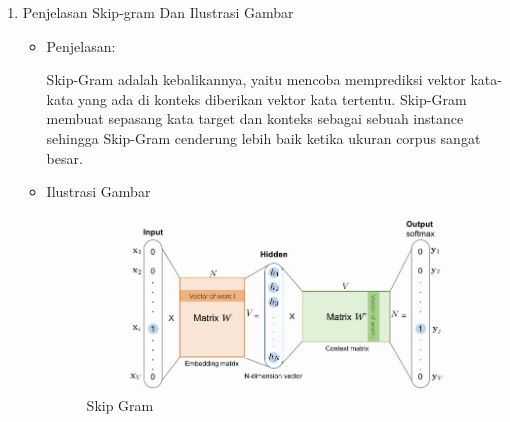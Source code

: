 \begin{enumerate}
\begin{itemize}
\end{itemize}

\item Penjelasan Skip-gram Dan Ilustrasi Gambar
\begin{itemize}
\item  Penjelasan:

Skip-Gram adalah kebalikannya, yaitu mencoba memprediksi vektor kata-kata yang ada di konteks diberikan vektor kata tertentu. Skip-Gram membuat sepasang kata target dan konteks sebagai sebuah instance sehingga Skip-Gram cenderung lebih baik ketika ukuran corpus sangat besar. 

\item Ilustrasi Gambar

\begin{figure}[!hbtp]
\centering
\includegraphics[scale=0.5]{figures/1174031/5/1.jpg}
\caption{Skip Gram}
\label{Skip Gram}
\end{figure}
\par
\par
\end{itemize}
\par
\par
\end{enumerate}

